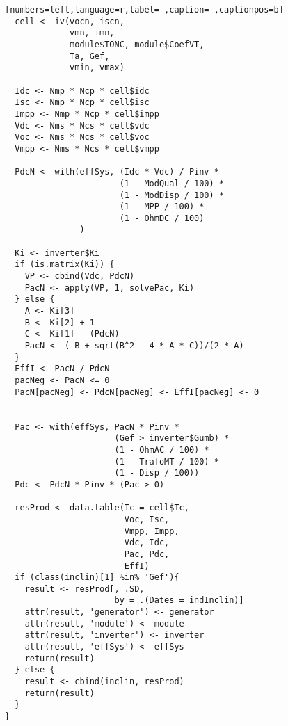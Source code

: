 \begin{lstlisting}[numbers=left,language=r,label= ,caption= ,captionpos=b]
  cell <- iv(vocn, iscn,
             vmn, imn,
             module$TONC, module$CoefVT,
             Ta, Gef,
             vmin, vmax)
  
  Idc <- Nmp * Ncp * cell$idc
  Isc <- Nmp * Ncp * cell$isc
  Impp <- Nmp * Ncp * cell$impp
  Vdc <- Nms * Ncs * cell$vdc
  Voc <- Nms * Ncs * cell$voc
  Vmpp <- Nms * Ncs * cell$vmpp
  
  PdcN <- with(effSys, (Idc * Vdc) / Pinv *
                       (1 - ModQual / 100) *
                       (1 - ModDisp / 100) *
                       (1 - MPP / 100) *
                       (1 - OhmDC / 100)
               ) 

  Ki <- inverter$Ki
  if (is.matrix(Ki)) { 
    VP <- cbind(Vdc, PdcN)
    PacN <- apply(VP, 1, solvePac, Ki)
  } else { 
    A <- Ki[3]
    B <- Ki[2] + 1
    C <- Ki[1] - (PdcN)
    PacN <- (-B + sqrt(B^2 - 4 * A * C))/(2 * A)
  }
  EffI <- PacN / PdcN
  pacNeg <- PacN <= 0
  PacN[pacNeg] <- PdcN[pacNeg] <- EffI[pacNeg] <- 0

  
  Pac <- with(effSys, PacN * Pinv *
                      (Gef > inverter$Gumb) *
                      (1 - OhmAC / 100) *
                      (1 - TrafoMT / 100) *
                      (1 - Disp / 100))
  Pdc <- PdcN * Pinv * (Pac > 0)
  
  resProd <- data.table(Tc = cell$Tc,
                        Voc, Isc,
                        Vmpp, Impp,
                        Vdc, Idc,
                        Pac, Pdc,
                        EffI)
  if (class(inclin)[1] %in% 'Gef'){
    result <- resProd[, .SD,
                      by = .(Dates = indInclin)]
    attr(result, 'generator') <- generator
    attr(result, 'module') <- module
    attr(result, 'inverter') <- inverter
    attr(result, 'effSys') <- effSys
    return(result)
  } else {
    result <- cbind(inclin, resProd)
    return(result)
  }
}
\end{lstlisting}

